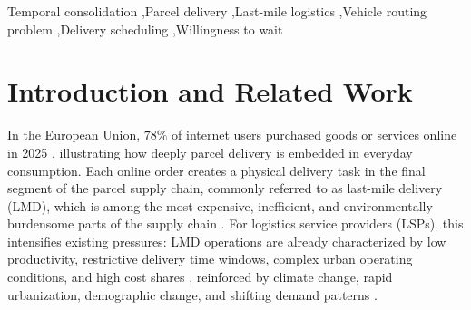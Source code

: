 \documentclass[3p,times,procedia]{elsarticle}
\begin{document}
\begin{frontmatter}
\begin{abstract}
\end{abstract}


\begin{keyword}
Temporal consolidation \sep Parcel delivery \sep Last-mile logistics \sep Vehicle routing problem \sep Delivery scheduling \sep Willingness to wait






\end{keyword}
\end{frontmatter}



\section{Introduction and Related Work}
\label{intro}

In the European Union, $78\%$ of internet users purchased goods or services online in 2025 \citep{Eurostat2025}, illustrating how deeply parcel delivery is embedded in everyday consumption. Each online order creates a physical delivery task in the final segment of the parcel supply chain, commonly referred to as last-mile delivery (LMD), which is among the most expensive, inefficient, and environmentally burdensome parts of the supply chain \citep{Olsson2019}. For logistics service providers (LSPs), this intensifies existing pressures: LMD operations are already characterized by low productivity, restrictive delivery time windows, complex urban operating conditions, and high cost shares \citep{BACHOFNER2022100020}, reinforced by climate change, rapid urbanization, demographic change, and shifting demand patterns \citep{logistics2040025}.
\end{document}
